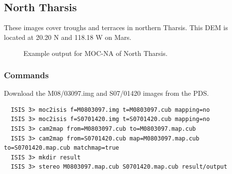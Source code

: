 \pagebreak
\subsection{North Tharsis}

These images cover troughs and terraces in northern Tharsis. 
This \ac{DEM} is located at 20.20 N and 118.18 W on Mars.

\begin{figure}[h!]
\centering
  \hfil
\caption{Example output for MOC-NA of North Tharsis.}
\label{fig:mocna_n_tharsis_example}
\end{figure}

\subsubsection*{Commands}

Download the M08/03097.img and S07/01420 images from the \ac{PDS}.
\begin{verbatim}
  ISIS 3> moc2isis f=M0803097.img t=M0803097.cub mapping=no
  ISIS 3> moc2isis f=S0701420.img t=S0701420.cub mapping=no
  ISIS 3> cam2map from=M0803097.cub to=M0803097.map.cub
  ISIS 3> cam2map from=S0701420.cub map=M0803097.map.cub to=S0701420.map.cub matchmap=true
  ISIS 3> mkdir result
  ISIS 3> stereo M0803097.map.cub S0701420.map.cub result/output
\end{verbatim}

